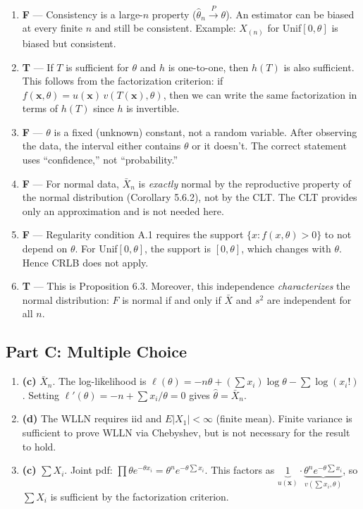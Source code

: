 \documentclass[11pt]{article}
\begin{document}
\begin{enumerate}[start=6]
\item \textbf{F} --- Consistency is a large-$n$ property ($\hat\theta_n \xrightarrow{P} \theta$). An estimator can be biased at every finite $n$ and still be consistent. Example: $X_{(n)}$ for Unif$[0,\theta]$ is biased but consistent.
\item \textbf{T} --- If $T$ is sufficient for $\theta$ and $h$ is one-to-one, then $h(T)$ is also sufficient. This follows from the factorization criterion: if $f(\mathbf{x},\theta) = u(\mathbf{x})\,v(T(\mathbf{x}),\theta)$, then we can write the same factorization in terms of $h(T)$ since $h$ is invertible.
\item \textbf{F} --- $\theta$ is a fixed (unknown) constant, not a random variable. After observing the data, the interval either contains $\theta$ or it doesn't. The correct statement uses ``confidence,'' not ``probability.''
\item \textbf{F} --- For normal data, $\bar X_n$ is \emph{exactly} normal by the reproductive property of the normal distribution (Corollary 5.6.2), not by the CLT. The CLT provides only an approximation and is not needed here.
\item \textbf{F} --- Regularity condition A.1 requires the support $\{x : f(x,\theta) > 0\}$ to not depend on $\theta$. For Unif$[0,\theta]$, the support is $[0,\theta]$, which changes with $\theta$. Hence CRLB does not apply.
\item \textbf{T} --- This is Proposition 6.3. Moreover, this independence \emph{characterizes} the normal distribution: $F$ is normal if and only if $\bar X$ and $s^2$ are independent for all $n$.
\end{enumerate}

\subsection*{Part C: Multiple Choice}

\begin{enumerate}[start=12]
\item \textbf{(c)} $\bar X_n$. The log-likelihood is $\ell(\theta) = -n\theta + (\sum x_i)\log\theta - \sum\log(x_i!)$. Setting $\ell'(\theta) = -n + \sum x_i/\theta = 0$ gives $\hat\theta = \bar X_n$.
\item \textbf{(d)} The WLLN requires iid and $E|X_1| < \infty$ (finite mean). Finite variance is sufficient to prove WLLN via Chebyshev, but is not necessary for the result to hold.
\item \textbf{(c)} $\sum X_i$. Joint pdf: $\prod \theta e^{-\theta x_i} = \theta^n e^{-\theta\sum x_i}$. This factors as $\underbrace{1}_{u(\mathbf{x})} \cdot \underbrace{\theta^n e^{-\theta\sum x_i}}_{v(\sum x_i, \theta)}$, so $\sum X_i$ is sufficient by the factorization criterion.
\end{enumerate}
\end{document}
